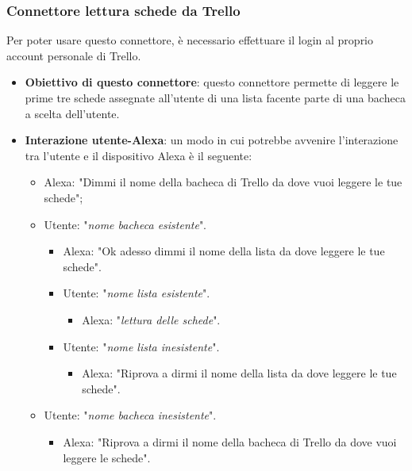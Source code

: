 \subsubsection{Connettore lettura schede da Trello}
Per poter usare questo connettore, è necessario effettuare il login al proprio account personale di Trello.
\begin{itemize}
	\item \textbf{Obiettivo di questo connettore}: questo connettore permette di leggere le prime tre schede assegnate all'utente di una lista facente parte di una bacheca a scelta dell'utente.
	\item \textbf{Interazione utente-Alexa}: un modo in cui potrebbe avvenire l'interazione tra l'utente e il dispositivo Alexa è il seguente:
	\begin{itemize}
		\item Alexa: "Dimmi il nome della bacheca di Trello da dove vuoi leggere le tue schede";
		\item Utente: "{\it nome bacheca esistente}".
		\begin{itemize}
			\item Alexa: "Ok adesso dimmi il nome della lista da dove leggere le tue schede".
			\item Utente: "{\it nome lista esistente}".
			\begin{itemize}
				\item Alexa: "{\it lettura delle schede}".
			\end{itemize}
			\item Utente: "{\it nome lista inesistente}".
			\begin{itemize}
				\item Alexa: "Riprova a dirmi il nome della lista da dove leggere le tue schede".
			\end{itemize}			
		\end{itemize}
		\item Utente: "{\it nome bacheca inesistente}".
		\begin{itemize}
			\item Alexa: "Riprova a dirmi il nome della bacheca di Trello da dove vuoi leggere le schede".
		\end{itemize}
	\end{itemize}
\end{itemize}

